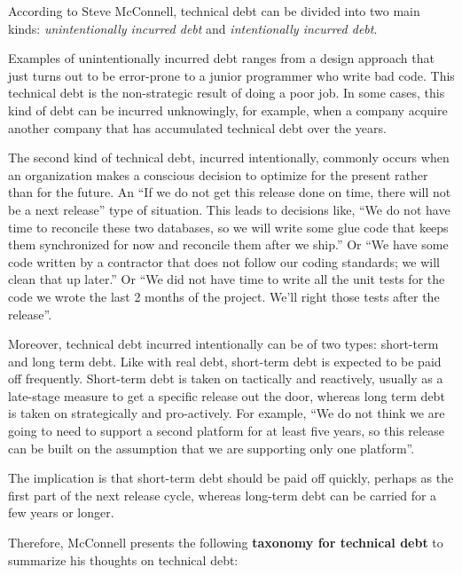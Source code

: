 According to Steve McConnell, technical debt can be divided into two main kinds: \textit{unintentionally incurred debt} and \textit{intentionally incurred debt}.

Examples of unintentionally incurred debt ranges from a design approach that just turns out to be error-prone to a junior programmer who  write bad code. This technical debt is the non-strategic result of doing a poor job. In some cases, this kind of debt can be incurred unknowingly, for example, when a company acquire another company that has accumulated technical debt over the years. 

The second kind of technical debt, incurred intentionally, commonly occurs when an organization makes a conscious decision to optimize for the present rather than for the future. An ``If we do not get this release done on time, there will not be a next release'' type of situation. This leads to decisions like, ``We do not have time to reconcile these two databases, so we will write some glue code that keeps them synchronized for now and reconcile them after we ship.'' Or ``We have some code written by a contractor that does not follow our coding standards; we will clean that up later.'' Or ``We did not have time to write all the unit tests for the code we wrote the last 2 months of the project. We'll right those tests after the release''. 

Moreover, technical debt incurred intentionally can be of two types: short-term and long term debt. Like with real debt, short-term debt is expected to be paid off frequently. Short-term debt is taken on tactically and reactively, usually as a late-stage measure to get a specific release out the door, whereas long term debt is taken on strategically and pro-actively. For example, ``We do not think we are going to need to support a second platform for at least five years, so this release can be built on the assumption that we are supporting only one platform''.

The implication is that short-term debt should be paid off quickly, perhaps as the first part of the next release cycle, whereas long-term debt can be carried for a few years or longer.

Therefore, McConnell presents the following \textbf{taxonomy for technical debt} to summarize his thoughts on technical debt:

